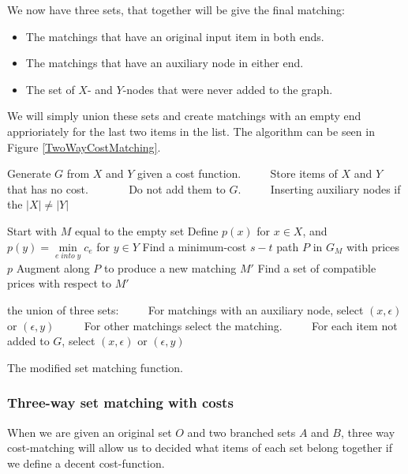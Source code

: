 \documentclass[11pt]{article}
\begin{document}
\endgroup

We now have three sets, that together will be give the final matching:
\begin{itemize}
   \item The matchings that have an original input item in both ends.
   \item The matchings that have an auxiliary node in either end.
   \item The set of $X$- and $Y$-nodes that were never added to the graph.
\end{itemize}

We will simply union these sets and create matchings with an empty end apprioriately for the last two items in the list. The algorithm can be seen in Figure \ref{TwoWayCostMatching}.



\begin{algorithm}
\begin{algorithmic}
	\State Generate $G$ from $X$ and $Y$ given a cost function.
	\State ~~~~ Store items of $X$ and $Y$ that has no cost.
	\State ~~~~~~ Do not add them to $G$.
	\State ~~~~ Inserting auxiliary nodes if the $|X| \neq |Y|$


	\State Start with $M$ equal to the empty set
	\State Define $p(x)$ for $x \in X$, and  $p(y) = \underset{e \; into \; y}{\operatorname{min}} c_e$ for $y \in Y$
    	\State Find a minimum-cost $s-t$ path $P$ in $G_M$ with prices $p$
    	\State Augment along $P$ to produce a new matching $M'$
    	\State Find a set of compatible prices with respect to $M'$
    \EndWhile
    

	\Return the union of three sets:
    \State ~~~~ For matchings with an auxiliary node, select $(x, \epsilon)$ or $(\epsilon, y)$
    \State ~~~~ For other matchings select the matching.
    \State ~~~~ For each item not added to $G$, select $(x, \epsilon)$ or $(\epsilon, y)$    
\EndFunction
\end{algorithmic}
\caption{The modified set matching function.}
\label{TwoWayCostMatching}
\end{algorithm}


\subsubsection{Three-way set matching with costs}
When we are given an original set $O$ and two branched sets $A$ and $B$, three way cost-matching will allow us to decided what items of each set belong together if we define a decent cost-function. 
\end{document}
